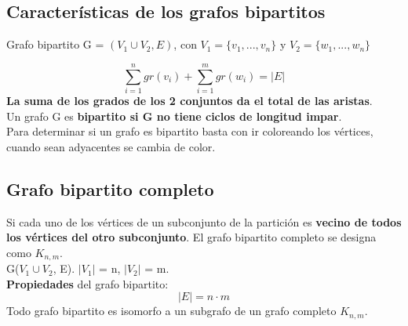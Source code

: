 \documentclass{article}
\begin{document}
\subsection{Características de los grafos bipartitos}
Grafo bipartito G = $(V_1 \cup V_2, E)$, con $V_1 = \{v_1, ..., v_n\}$ y $V_2 = \{w_1, ..., w_n\}$

$$\sum_{i=1}^n gr(v_i) + \sum_{i=1}^m gr(w_i) = |E|$$
\textbf{La suma de los grados de los 2 conjuntos da el total de las aristas}. \\

Un grafo G es \textbf{bipartito si G no tiene ciclos de longitud impar}. \\

Para determinar si un grafo es bipartito basta con ir coloreando los vértices, cuando sean adyacentes se cambia de color.

\newpage

\subsection{Grafo bipartito completo}
Si cada uno de los vértices de un subconjunto de la partición es \textbf{vecino de todos los vértices del otro subconjunto}. El grafo bipartito completo se designa como $K_{n, m}$. \\
G($V_1 \cup V_2$, E). $|V_1|$ = n, $|V_2|$ = m. \\

\textbf{Propiedades} del grafo bipartito: \\ 
$$|E| = n \cdot m$$
Todo grafo bipartito es isomorfo a un subgrafo de un grafo completo $K_{n, m}$.


\end{document}
